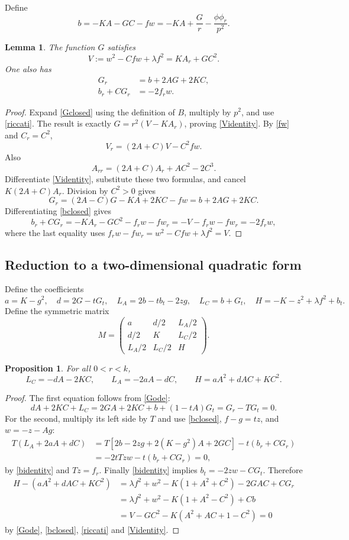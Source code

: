 \documentclass[11pt]{article}
\newtheorem{lemma}[theorem]{Lemma}
\newtheorem{proposition}[theorem]{Proposition}
\theoremstyle{remark}
\begin{document}
Define
\begin{equation}\label{bclosed}
 b=-KA-GC-fw=-KA+\frac Gr-\frac{\phi\phi_r}{p^2}.
\end{equation}
\begin{lemma}
The function $G$ satisfies
\begin{equation}\label{Videntity}
 V:=w^2-Cfw+\lambda f^2=K A_r+GC^2.
\end{equation}
One also has
\begin{align}
 G_r&=b+2AG+2KC,\label{Gode}\\
 b_r+CG_r&=-2f_rw.\label{bidentity}
\end{align}
\end{lemma}
\begin{proof}
Expand \eqref{Gclosed} using the definition of $B$, multiply by $p^2$,
and use \eqref{riccati}. The result is exactly
$G=r^2(V-KA_r)$, proving \eqref{Videntity}.
By \eqref{fw} and $C_r=C^2$,
\[
 V_r=(2A+C)V-C^2fw.
\]
Also
\[
 A_{rr}=(2A+C)A_r+AC^2-2C^3.
\]
Differentiate \eqref{Videntity}, substitute these two formulas, and
cancel $K(2A+C)A_r$. Division by $C^2>0$ gives
\[
 G_r=(2A-C)G-KA+2KC-fw=b+2AG+2KC.
\]
Differentiating \eqref{bclosed} gives
\[
 b_r+CG_r=-KA_r-GC^2-f_rw-fw_r
         =-V-f_rw-fw_r=-2f_rw,
\]
where the last equality uses
$f_rw-fw_r=w^2-Cfw+\lambda f^2=V$.
\end{proof}

\subsection{Reduction to a two-dimensional quadratic form}
Define the coefficients
\[
 a=K-g^2,\quad d=2G-tG_t,\quad
 L_A=2b-tb_t-2zg,\quad L_C=b+G_t,\quad
 H=-K-z^2+\lambda f^2+b_t.
\]
Define the symmetric matrix
\[
 M=\begin{pmatrix}
 a&d/2&L_A/2\\ d/2&K&L_C/2\\L_A/2&L_C/2&H
 \end{pmatrix}.
\]
\begin{proposition}\label{kernel}
For all $0<r<k$,
\[
 L_C=-dA-2KC,\qquad L_A=-2aA-dC,\qquad
 H=aA^2+dAC+KC^2.
\]

\end{proposition}
\begin{proof}
The first equation follows from \eqref{Gode}:
\[
 dA+2KC+L_C=2GA+2KC+b+(1-tA)G_t
                    =G_r-TG_t=0.
\]
For the second, multiply its left side by $T$ and use
\eqref{bclosed}, $f-g=tz$, and $w=-z-Ag$:
\begin{align*}
 T(L_A+2aA+dC)
 &=T[2b-2zg+2(K-g^2)A+2GC]-t(b_r+CG_r)\\
 &=-2tTzw-t(b_r+CG_r)=0,
\end{align*}
by \eqref{bidentity} and $Tz=f_r$.
Finally \eqref{bidentity} implies $b_t=-2zw-CG_t$. Therefore
\begin{align*}
 H-(aA^2+dAC+KC^2)
 &=\lambda f^2+w^2-K(1+A^2+C^2)-2GAC+CG_r\\
 &=\lambda f^2+w^2-K(1+A^2-C^2)+Cb\\
 &=V-GC^2-K(A^2+AC+1-C^2)=0
\end{align*}
by \eqref{Gode}, \eqref{bclosed}, \eqref{riccati} and
\eqref{Videntity}.
\end{proof}
\end{document}
